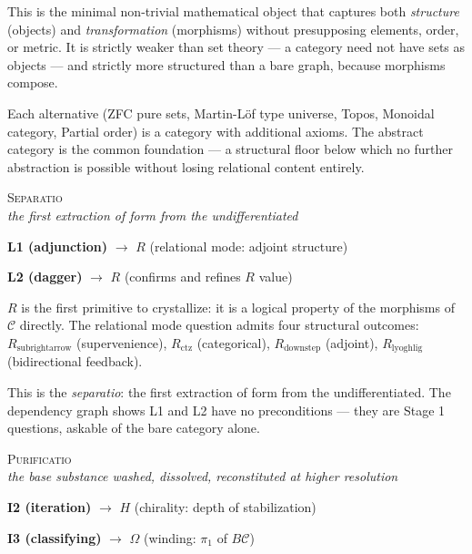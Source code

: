 \documentclass[12pt,a4paper]{article}
\begin{document}
This is the minimal non-trivial mathematical object that captures both \emph{structure} (objects) and \emph{transformation} (morphisms) without presupposing elements, order, or metric. It is strictly weaker than set theory --- a category need not have sets as objects --- and strictly more structured than a bare graph, because morphisms compose.

Each alternative (ZFC pure sets, Martin-L\"of type universe, Topos, Monoidal category, Partial order) is a category with additional axioms. The abstract category is the common foundation --- a structural floor below which no further abstraction is possible without losing relational content entirely.

\bigskip
\begin{center}
\vspace{0.5em}
{\large\textsc{Separatio}}
\\[4pt]
{\small\itshape the first extraction of form from the undifferentiated}
\vspace{0.4em}
\end{center}

\noindent\textbf{L1 (adjunction)} $\to$ $R$ (relational mode: adjoint structure)

\noindent\textbf{L2 (dagger)} $\to$ $R$ (confirms and refines $R$ value)

$R$ is the first primitive to crystallize: it is a logical property of the morphisms of $\mathcal{C}$ directly. The relational mode question admits four structural outcomes: $R_{\text{subrightarrow}}$ (supervenience), $R_{\text{ctz}}$ (categorical), $R_{\text{downstep}}$ (adjoint), $R_{\text{lyoghlig}}$ (bidirectional feedback). 

This is the \emph{separatio}: the first extraction of form from the undifferentiated. The dependency graph shows L1 and L2 have no preconditions --- they are Stage 1 questions, askable of the bare category alone.

\bigskip
\begin{center}
\vspace{0.5em}
{\large\textsc{Purificatio}}
\\[4pt]
{\small\itshape the base substance washed, dissolved, reconstituted at higher resolution}
\vspace{0.4em}
\end{center}

\noindent\textbf{I2 (iteration)} $\to$ $H$ (chirality: depth of stabilization)

\noindent\textbf{I3 (classifying)} $\to$ $\Omega$ (winding: $\pi_1$ of $B\mathcal{C}$)
\end{document}
